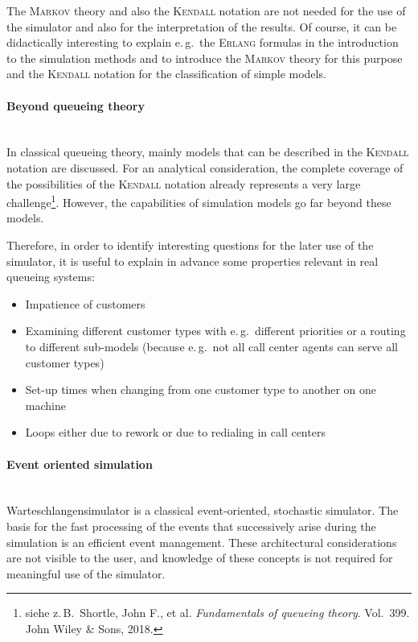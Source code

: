 \documentclass{svmono}
\begin{document}
The \textsc{Markov} theory and also the \textsc{Kendall} notation are not needed for the use of the simulator and also for the interpretation of the results. Of course, it can be didactically interesting to explain e.\,g.\ the \textsc{Erlang} formulas in the introduction to the simulation methods and to introduce the \textsc{Markov} theory for this purpose and the \textsc{Kendall} notation for the classification of simple models.

\paragraph{Beyond queueing theory}~\\
In classical queueing theory, mainly models that can be described in the \textsc{Kendall} notation are discussed. For an analytical consideration, the complete coverage of the possibilities of the \textsc{Kendall} notation already represents a very large challenge\footnote{siehe z.\,B.\ Shortle, John F., et al. \emph{Fundamentals of queueing theory}. Vol.\ 399. John Wiley \& Sons, 2018.}. However, the capabilities of simulation models go far beyond these models.

Therefore, in order to identify interesting questions for the later use of the simulator, it is useful to explain in advance some properties relevant in real queueing systems:

\begin{itemize}
\item
Impatience of customers
\item
Examining different customer types with e.\,g.\ different priorities or a routing to different sub-models (because e.\,g.\ not all call center agents can serve all customer types)
\item
Set-up times when changing from one customer type to another on one machine
\item
Loops either due to rework or due to redialing in call centers
\end{itemize}

\paragraph{Event oriented simulation}~\\
Warteschlangensimulator is a classical event-oriented, stochastic simulator. The basis for the fast processing of the events that successively arise during the simulation is an efficient event management. These architectural considerations are not visible to the user, and knowledge of these concepts is not required for meaningful use of the simulator.
\end{document}

